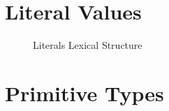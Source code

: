 \section{Literal Values}\label{sec:literals}

\begin{figure}
\verbatimfont{\small}
\begin{framed}

\end{framed}
\caption{Literals Lexical Structure}
\label{fig:literals-syntax}
\end{figure}

\section{Primitive Types}\label{sec:primitive-types}
